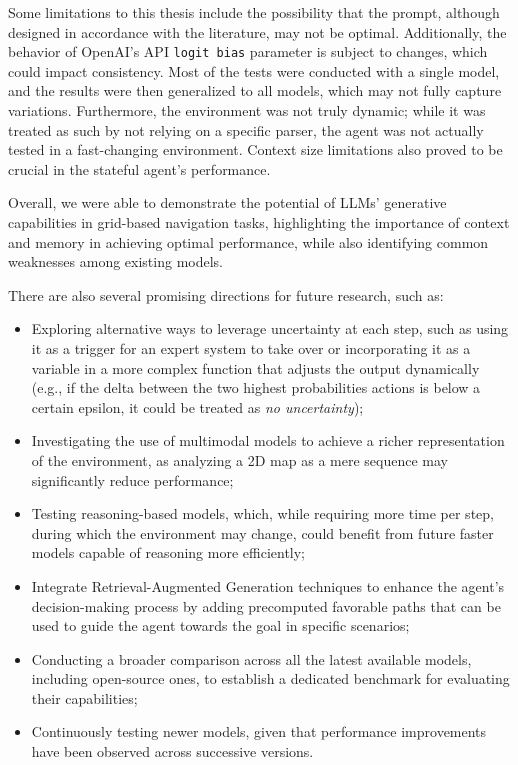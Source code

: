 Some limitations to this thesis include the possibility that the prompt,
although designed in accordance with the literature, may not be optimal.
Additionally, the behavior of OpenAI's API \texttt{logit bias} parameter is
subject to changes, which could impact consistency. Most of the tests were
conducted with a single model, and the results were then generalized to all models,
which may not fully capture variations. Furthermore, the environment was not
truly dynamic; while it was treated as such by not relying on a specific parser,
the agent was not actually tested in a fast-changing environment. Context size limitations
also proved to be crucial in the stateful agent's performance.
\vspace{1mm}

Overall, we were able to demonstrate the potential of LLMs' generative capabilities
in grid-based navigation tasks, highlighting the importance of context and
memory in achieving optimal performance, while also identifying common weaknesses
among existing models.

There are also several promising directions for future research, such as:

\begin{itemize}
  \item Exploring alternative ways to leverage uncertainty at each step, such as
    using it as a trigger for an expert system to take over or incorporating it
    as a variable in a more complex function that adjusts the output dynamically
    (e.g., if the delta between the two highest probabilities actions is below a
    certain epsilon, it could be treated as \emph{no uncertainty});

  \item Investigating the use of multimodal models to achieve a richer representation
    of the environment, as analyzing a 2D map as a mere sequence may
    significantly reduce performance;

  \item Testing reasoning-based models, which, while requiring more time per step,
    during which the environment may change, could benefit from future faster models
    capable of reasoning more efficiently;

  \item Integrate Retrieval-Augmented Generation techniques to enhance the agent's
    decision-making process by adding precomputed favorable paths that can be used
    to guide the agent towards the goal in specific scenarios;

  \item Conducting a broader comparison across all the latest available models,
    including open-source ones, to establish a dedicated benchmark for evaluating
    their capabilities;

  \item Continuously testing newer models, given that performance improvements
    have been observed across successive versions.
\end{itemize}